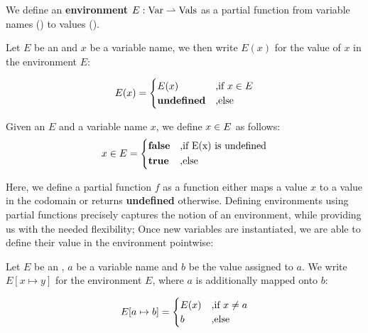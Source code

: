 \begin{definition}[Environment]\label{def:environment}
   We define an \textbf{environment} \(E: \text{\Var} \partialto \text{\Vals}\) as a partial function from variable names (\Var) to values (\Vals). 
\end{definition}

\begin{definition}\label{def:environment-getter}	
   Let \(E\) be an  and \(x\) be a variable name, we then write \(E(x)\) for the value of \(x\) in the environment \(E\):

   \[
      E(x) =
      \begin{cases}
	 E(x)		    & \mbox{,if } \contains{E}{x} \\
	 \textbf{undefined} &\mbox{,else}
      \end{cases}
   \]
\end{definition}

\begin{definition}\label{def:in-environment}
   Given an  \(E\) and a variable name \(x\), we define \(\contains{E}{x}\) as follows:
   \[
      \contains{E}{x} = 
      \begin{cases*}
	 \false & \mbox{,if E(x) is undefined}\\
	 \true & \mbox{,else} 
      \end{cases*}
   \]
\end{definition}

Here, we define a partial function \(f\) as a function either maps a value \(x\) to a value in the codomain or returns \textbf{undefined} otherwise. Defining environments using partial functions precisely captures the notion of an environment, while providing us with the needed flexibility; Once new variables are instantiated, we are able to define their value in the environment pointwise:

\begin{definition}\label{def:environment-augment}	
   Let \(E\) be an , \(a\) be a variable name and \(b\) be the value assigned to \(a\). We write \(E[x \mapsto y]\) for the environment \(E\), where \(a\) is additionally mapped onto \(b\):

   \[
      \envaugment{E}{a}{b} = 
      \begin{cases}
	 E(x)  & \mbox{,if } x \neq a\\
	 b     & \mbox{,else } 
      \end{cases}
   \]

\end{definition}

